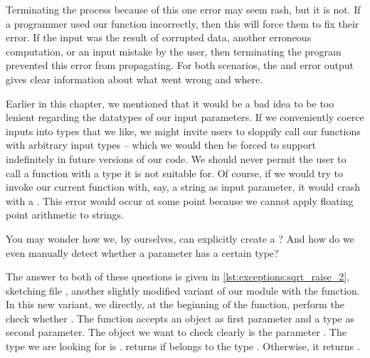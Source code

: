 Terminating the process because of this one error may seem rash, but it is not.
If a programmer used our  function incorrectly, then this will force them to fix their error.
If the input  was the result of corrupted data, another erroneous computation, or an input mistake by the user, then terminating the program prevented this error from propagating.
For both scenarios, the  and error output gives clear information about what went wrong and where.

%
%
%
%
%
%
%

Earlier in this chapter, we mentioned that it would be a bad idea to be too lenient regarding the datatypes of our input parameters.
If we conveniently coerce inputs into types that we like, we might invite users to sloppily call our functions with arbitrary input types -- which we would then be forced to support indefinitely in future versions of our code.
We should never permit the user to call a function with a type it is not suitable for.
Of course, if we would try to invoke our current  function with, say, a string as input parameter, it would crash with a .
This error would occur at some point because we cannot apply floating point arithmetic to strings.

You may wonder how we, by ourselves, can explicitly create a ?
And how do we even manually detect whether a parameter has a certain type?

The answer to both of these questions is given in \cref{lst:exceptions:sqrt_raise_2}, sketching file , another slightly modified variant of our module with the  function.
In this new variant, we directly, at the beginning of the function, perform the check whether .
The function  accepts an object as first parameter and a type as second parameter.
The object we want to check clearly is the parameter .
The type we are looking for is .
 returns  if  belongs to the type .
Otherwise, it returns .

